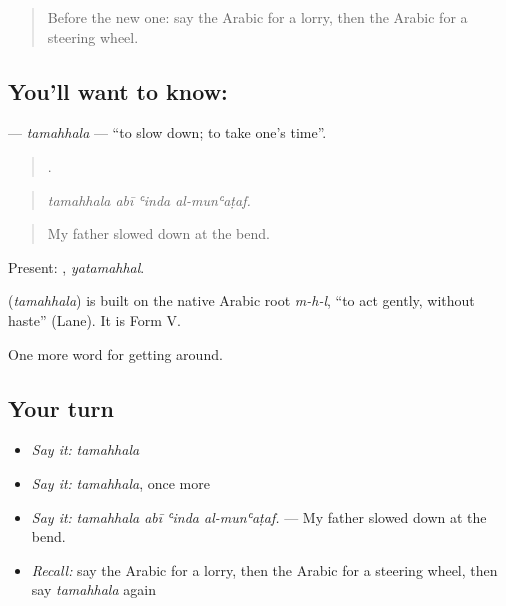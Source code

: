 \label{lesson:AR-C445-tamahhala}



\begin{quote}
Before the new one: say the Arabic for a lorry, then the Arabic for a steering wheel.
\end{quote}

\subsection*{You'll want to know: }
\textbf{} — \emph{tamahhala} — \textquotedblleft{}to slow down; to take one's time\textquotedblright{}.

\begin{quote}
   .
\end{quote}

\begin{quote}
\emph{tamahhala abī ʿinda al-munʿaṭaf.}
\end{quote}

\begin{quote}
My father slowed down at the bend.
\end{quote}

Present: , \emph{yatamahhal}.

\begin{cousinweb}
\textbf{} (\emph{tamahhala}) is built on the native Arabic root \emph{m-h-l}, \textquotedblleft{}to act gently, without haste\textquotedblright{} (Lane). It is Form V.
\end{cousinweb}

\begin{grammarlens}[title={What you've built}]
One more word for getting around.
\end{grammarlens}

\subsection*{Your turn}
\begin{itemize}
\raggedright
  \item \emph{Say it:} \emph{tamahhala}
  \item \emph{Say it:} \emph{tamahhala}, once more
  \item \emph{Say it:} \emph{tamahhala abī ʿinda al-munʿaṭaf.} — My father slowed down at the bend.
  \item \emph{Recall:} say the Arabic for a lorry, then the Arabic for a steering wheel, then say \emph{tamahhala} again
\end{itemize}

